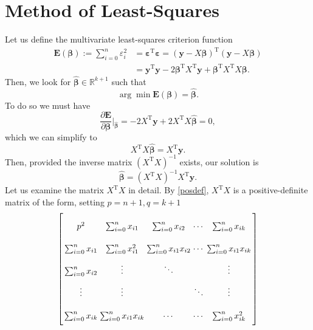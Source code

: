 \documentclass[10pt,a4paper, onecolumn, conference]{IEEEtran}
\theoremstyle{own}
\theoremstyle{definition}
\theoremstyle{plain}
\begin{document}
\section{Method of Least-Squares}
Let us define the multivariate least-squares criterion function
\begin{align} \nonumber
\mathbf{E}(\boldsymbol\beta) := \sum_{i = 0}^n \varepsilon_i^2 & = \boldsymbol\varepsilon^{\text{T}} \boldsymbol\varepsilon = (\mathbf{y} - X \boldsymbol\beta)^{\text{T}} (\mathbf{y} - X \boldsymbol\beta) \\
& = \mathbf{y}^{\text{T}}\mathbf{y} - 2\boldsymbol\beta^{\text{T}}X^{\text{T}}\mathbf{y} + \boldsymbol\beta^{\text{T}}X^{\text{T}} X\boldsymbol\beta.
\end{align}
Then, we look for $\hat{\boldsymbol\beta} \in \mathbb{R}^{k+1}$ such that
\begin{equation}
\arg \min \mathbf{E} (\boldsymbol\beta) = \hat{\boldsymbol\beta}.
\end{equation}
To do so we must have
\begin{equation}
\frac{\partial \mathbf{E}}{\partial \boldsymbol\beta} \Big|_{\hat{\boldsymbol\beta}} = -2X^{\text{T}}\mathbf{y} + 2 X^{\text{T}} X \hat{\boldsymbol\beta} =  0,
\end{equation}
which we can simplify to
\begin{equation}
X^{\text{T}} X \hat{\boldsymbol\beta} = X^{\text{T}}\mathbf{y}.
\end{equation}
Then, provided the inverse matrix $(X^{\text{T}} X)^{-1}$ exists, our solution is
\begin{equation}
\hat{\boldsymbol\beta} = (X^{\text{T}} X)^{-1} X^{\text{T}}\mathbf{y}.
\end{equation}
Let us examine the matrix $X^{\text{T}} X$ in detail. By \cref{posdef}, $X^{\text{T}} X$ is a positive-definite matrix of the form, setting $p = n+1, q = k+1$
\begin{equation*} \arraycolsep=1.4pt\def\arraystretch{2.2}
\left[ \begin{array}{ccccc} p^2 & \sum_{i = 0}^n x_{i1} & \sum_{i = 0}^n x_{i2} & \cdots & \sum_{i = 0}^n x_{ik} \\
             \sum_{i = 0}^n x_{i1} & \sum_{i = 0}^n x_{i1}^2 & \sum_{i = 0}^n x_{i1}x_{i2} & \cdots & \sum_{i = 0}^n x_{i1}x_{ik} \\
             \sum_{i = 0}^n x_{i2} & \vdots & \ddots & & \vdots\\
             \vdots				   & \vdots &  & \ddots & \vdots \\
             \sum_{i = 0}^n x_{ik} & \sum_{i = 0}^n x_{i1}x_{ik}  & \cdots & \cdots & \sum_{i = 0}^n x_{ik}^2

\end{array} \right]
\end{equation*}
\end{document}
